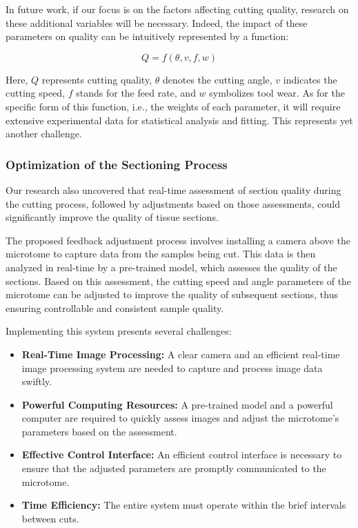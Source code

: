 In future work, if our focus is on the factors affecting cutting quality, research on these additional variables will be necessary. Indeed, the impact of these parameters on quality can be intuitively represented by a function:

\begin{equation}
Q = f(\theta, v, f, w)
\end{equation}

Here, $Q$ represents cutting quality, $\theta$ denotes the cutting angle, $v$ indicates the cutting speed, $f$ stands for the feed rate, and $w$ symbolizes tool wear. As for the specific form of this function, i.e., the weights of each parameter, it will require extensive experimental data for statistical analysis and fitting. This represents yet another challenge.

\subsubsection{Optimization of the Sectioning Process}

Our research also uncovered that real-time assessment of section quality during the cutting process, followed by adjustments based on those assessments, could significantly improve the quality of tissue sections.

The proposed feedback adjustment process involves installing a camera above the microtome to capture data from the samples being cut. This data is then analyzed in real-time by a pre-trained model, which assesses the quality of the sections. Based on this assessment, the cutting speed and angle parameters of the microtome can be adjusted to improve the quality of subsequent sections, thus ensuring controllable and consistent sample quality.

Implementing this system presents several challenges:

\begin{itemize}
    \item \textbf{Real-Time Image Processing:} A clear camera and an efficient real-time image processing system are needed to capture and process image data swiftly.
    \item \textbf{Powerful Computing Resources:} A pre-trained model and a powerful computer are required to quickly assess images and adjust the microtome's parameters based on the assessment.
    \item \textbf{Effective Control Interface:} An efficient control interface is necessary to ensure that the adjusted parameters are promptly communicated to the microtome.
    \item \textbf{Time Efficiency:} The entire system must operate within the brief intervals between cuts.
\end{itemize}

